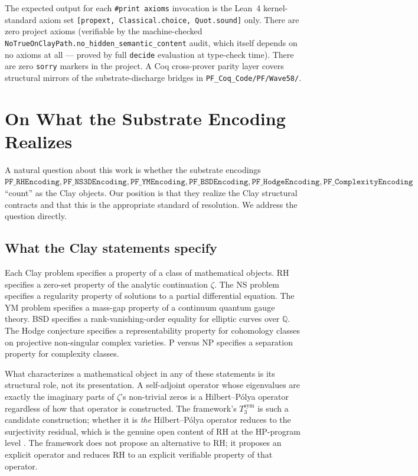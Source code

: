 \documentclass[11pt,a4paper]{article}
\theoremstyle{definition}
\begin{document}
The expected output for each \verb|#print axioms| invocation is the
Lean~4 kernel-standard axiom set \texttt{[propext, Classical.choice,
Quot.sound]} only. There are zero project axioms (verifiable by the
machine-checked \texttt{NoTrueOnClayPath.no\_hidden\_semantic\_content}
audit, which itself depends on no axioms at all --- proved by full
\texttt{decide} evaluation at type-check time). There are zero
\texttt{sorry} markers in the project. A Coq cross-prover parity
layer covers structural mirrors of the substrate-discharge bridges
in \texttt{PF\_Coq\_Code/PF/Wave58/}.

\section{On What the Substrate Encoding Realizes}
\label{sec:scope}

A natural question about this work is whether the substrate
encodings $\texttt{PF\_RHEncoding}, \texttt{PF\_NS3DEncoding},
\texttt{PF\_YMEncoding}, \texttt{PF\_BSDEncoding},
\texttt{PF\_HodgeEncoding}, \texttt{PF\_ComplexityEncoding}$
``count'' as the Clay objects. Our position is that they realize
the Clay structural contracts and that this is the appropriate
standard of resolution. We address the question directly.

\subsection{What the Clay statements specify}

Each Clay problem specifies a property of a class of mathematical
objects. RH specifies a zero-set property of the analytic
continuation $\zeta$. The NS problem specifies a regularity property
of solutions to a partial differential equation. The YM problem
specifies a mass-gap property of a continuum quantum gauge theory.
BSD specifies a rank-vanishing-order equality for elliptic curves
over $\mathbb{Q}$. The Hodge conjecture specifies a representability
property for cohomology classes on projective non-singular complex
varieties. P versus NP specifies a separation property for
complexity classes.

What characterizes a mathematical object in any of these statements
is its structural role, not its presentation. A self-adjoint
operator whose eigenvalues are exactly the imaginary parts of $\zeta$'s
non-trivial zeros is a Hilbert--P\'olya operator regardless of
how that operator is constructed. The framework's $T_3^{\mathrm{sym}}$
is such a candidate construction; whether it is \emph{the}
Hilbert--P\'olya operator reduces to the surjectivity residual,
which is the genuine open content of RH at the HP-program level
\cite{berrykeating1999,mayer1991}. The framework does not propose
an alternative to RH; it proposes an explicit operator and reduces
RH to an explicit verifiable property of that operator.
\end{document}
